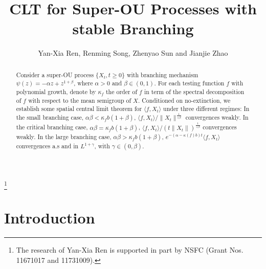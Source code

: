 \documentclass[12pt]{amsart}
\theoremstyle{plain}
\theoremstyle{definition}
\numberwithin{equation}{section}
\begin{document}
\title
    [CLT for Super-OU processes]
    {CLT for Super-OU Processes with stable Branching}
\author
    [Y.-X. Ren, R. Song, Z. Sun and J. Zhao]
    {Yan-Xia Ren, Renming Song, Zhenyao Sun and Jianjie Zhao}
\address
    {Yan-Xia Ren\\
    School of Mathematical Sciences\\
    Peking University\\
    Beijing, P. R. China, 100871}
\thanks{The research of Yan-Xia Ren is supported in part by NSFC (Grant Nos. 11671017  and 11731009).}
\address
    {Zhenyao Sun\\
    School of Mathematical Sciences\\
    Peking University\\
    Beijing, P. R. China, 100871}
\address
    {Jianjie Zhao\\
    School of Mathematical Sciences\\
    Peking University\\
    Beijing, P. R. China, 100871}
\maketitle
\begin{abstract}
    Consider a super-OU process $\{X_t, t\geq 0\}$ with branching mechanism $\psi(z)=-\alpha z +z^{1+\beta}$, where $\alpha >0$ and $\beta\in (0,1)$. For each testing function $f$ with polynomial growth, denote by $\kappa_f$ the order of $f$ in term of the spectral decomposition of $f$ with respect to the mean semigroup of $X$. Conditioned on no-extinction, we establish some spatial central limit theorem for $\langle f, X_t \rangle$ under three different regimes: In the small branching case, $\alpha\beta< \kappa_f b(1+\beta)$, $\langle f,X_t\rangle/\|X_t\|^{\frac{1}{+\beta}}$ convergences weakly. In the critical branching case, $\alpha\beta= \kappa_f b(1+\beta)$,  $\langle f,X_t\rangle/(t\|X_t\|)^{\frac{1}{+\beta}}$ convergences weakly. In the large branching case,  $\alpha\beta> \kappa_f b(1+\beta)$, $e^{-(\alpha-\kappa(f)b)t}\langle f,X_t\rangle$ convergences a.s and in $L^{1+\gamma}$, with $\gamma \in (0,\beta)$.
\end{abstract}
\section{Introduction}
\end{document}
